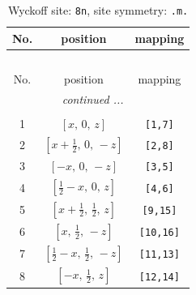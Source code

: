 \documentclass[fleqn,8pt]{jsarticle}
\begin{document}
\begin{longtable}{ccc}
\caption{Wyckoff site: {\tt 8n}, site symmetry: {\tt .m.}}
 \\
 \hline \hline
No. & position & mapping \\ \hline \endfirsthead

\multicolumn{2}{l}{\tablename\ \thetable{}} \\
 \hline \hline
No. & position & mapping \\ \hline \endhead

 \hline \hline
\multicolumn{2}{r}{\footnotesize\it continued ...} \\ \endfoot

 \hline \hline
\multicolumn{2}{r}{} \\ \endlastfoot

1 & $\left[ x,\, 0,\, z \right]$ & {\tt [1,7]} \\ \hline
2 & $\left[ x + \frac{1}{2},\, 0,\, - z \right]$ & {\tt [2,8]} \\ \hline
3 & $\left[ - x,\, 0,\, - z \right]$ & {\tt [3,5]} \\ \hline
4 & $\left[ \frac{1}{2} - x,\, 0,\, z \right]$ & {\tt [4,6]} \\ \hline
5 & $\left[ x + \frac{1}{2},\, \frac{1}{2},\, z \right]$ & {\tt [9,15]} \\ \hline
6 & $\left[ x,\, \frac{1}{2},\, - z \right]$ & {\tt [10,16]} \\ \hline
7 & $\left[ \frac{1}{2} - x,\, \frac{1}{2},\, - z \right]$ & {\tt [11,13]} \\ \hline
8 & $\left[ - x,\, \frac{1}{2},\, z \right]$ & {\tt [12,14]} \\
\end{longtable}
\renewcommand{\arraystretch}{1.2}
\end{document}
